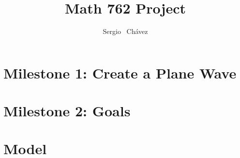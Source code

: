 \documentclass{article}
\title{Math 762 Project}
\author{
  Sergio ~Ch\'{a}vez
}
\begin{document}
\maketitle

\begin{abstract}

\end{abstract}



\section{Milestone 1: Create a Plane Wave}



\section{Milestone 2: Goals}

\section{Model}





\end{document}
